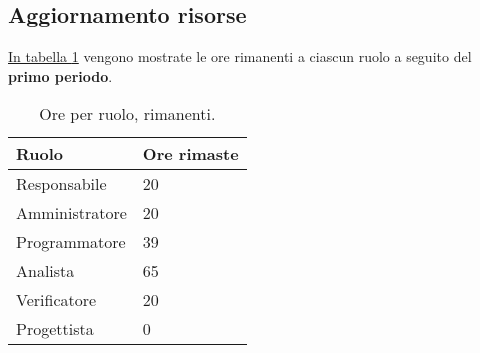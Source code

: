 \subsection{Aggiornamento risorse}

\label{sec:AggiornamentoRisorse_PrimoPeriodo}



\hyperref[tab:risorse_rimaste_primo_periodo]{In tabella \ref{tab:risorse_rimaste_primo_periodo}} vengono mostrate le ore rimanenti a ciascun ruolo a seguito del \textbf{primo periodo}.
\begin{table}[H]
    \centering
    \begin{tabular}{| l | l |}
    \hline
        \textbf{Ruolo} & 
        \textbf{Ore rimaste}\\
    \hline
        Responsabile & 20\\
    \hline
        Amministratore & 20\\
    \hline
        Programmatore & 39\\
    \hline
        Analista & 65\\
    \hline
        Verificatore & 20\\
    \hline
        Progettista & 0\\
    \hline
    \end{tabular}
    \caption{Ore per ruolo, rimanenti.}
    \label{tab:risorse_rimaste_primo_periodo} 
\end{table}